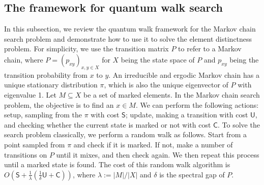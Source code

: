 \documentclass[10pt,a4paper]{article}
\renewcommand{\varepsilon}{\lambda}
\begin{document}
\subsection{The framework for quantum walk search}
\label{sec:qw-framework}
In this subsection, we review the quantum walk framework for the Markov chain search problem and demonstrate how to use it to solve the element distinctness problem. For simplicity, we use the transition matrix $P$ to refer to a Markov chain, where $P = (p_{xy})_{x, y \in X}$ for $X$ being the state space of $P$ and $p_{xy}$ being the transition probability from $x$ to $y$. An irreducible and ergodic Markov chain has a unique stationary distribution $\pi$, which is also the unique eigenvector of $P$ with eigenvalue 1. Let $M \subseteq X$ be a set of marked elements. In the Markov chain search problem, the objective is to find an $x \in M$. We can perform the following actions: setup, sampling from the $\pi$ with cost $\mathsf{S}$; update, making a transition with cost $\mathsf{U}$, and checking whether the current state is marked or not with cost $\mathsf{C}$. To solve the search problem classically, we perform a random walk as follows. Start from a point sampled from $\pi$ and check if it is marked. If not, make a number of transitions on $P$ until it mixes, and then check again. We then repeat this process until a marked state is found. The cost of this random walk algorithm is $O(\mathsf{S} + \frac{1}{\varepsilon}(\frac{1}{\delta}\mathsf{U} + \mathsf{C}))$, where $\varepsilon:= |M|/|X|$ and $\delta$ is the spectral gap of $P$.
\end{document}
